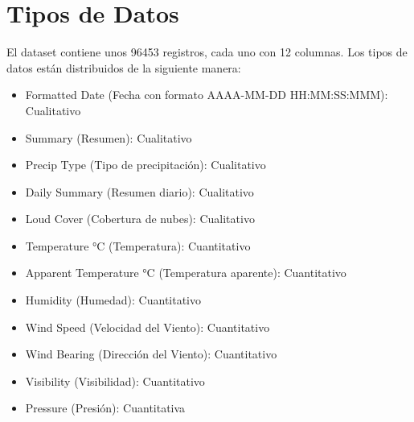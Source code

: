 \documentclass[a4paper,10pt]{article}
\begin{document}
\section{Tipos de Datos}
El dataset contiene unos 96453 registros, cada uno con 12 columnas. Los tipos de datos están distribuidos de la siguiente manera:
\begin{itemize}
 \item Formatted Date (Fecha con formato AAAA-MM-DD HH:MM:SS:MMM): Cualitativo
 \item Summary (Resumen): Cualitativo
 \item Precip Type (Tipo de precipitación): Cualitativo
 \item Daily Summary (Resumen diario): Cualitativo
 \item Loud Cover (Cobertura de nubes): Cualitativo
 \item Temperature °C (Temperatura): Cuantitativo
 \item Apparent Temperature °C (Temperatura aparente): Cuantitativo
 \item Humidity (Humedad): Cuantitativo
 \item Wind Speed (Velocidad del Viento): Cuantitativo
 \item Wind Bearing (Dirección del Viento): Cuantitativo
 \item Visibility (Visibilidad): Cuantitativo
 \item Pressure (Presión): Cuantitativa
\end{itemize}
\end{document}
